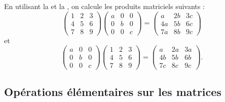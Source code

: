 \begin{ex}
En utilisant la  et la , on calcule les produits matriciels suivants : \[\begin{pmatrix}
1 & 2 & 3 \\
4 & 5 & 6 \\
7 & 8 & 9
\end{pmatrix}\begin{pmatrix}
a & 0 & 0 \\
0 & b & 0 \\
0 & 0 & c
\end{pmatrix}=\begin{pmatrix}
a & 2b & 3c \\
4a & 5b & 6c \\
7a & 8b & 9c
\end{pmatrix}\] et \[\begin{pmatrix}
a & 0 & 0 \\
0 & b & 0 \\
0 & 0 & c
\end{pmatrix}\begin{pmatrix}
1 & 2 & 3 \\
4 & 5 & 6 \\
7 & 8 & 9
\end{pmatrix}=\begin{pmatrix}
a & 2a & 3a \\
4b & 5b & 6b \\
7c & 8c & 9c
\end{pmatrix}.\]
\end{ex}

\subsection{Opérations élémentaires sur les matrices}

